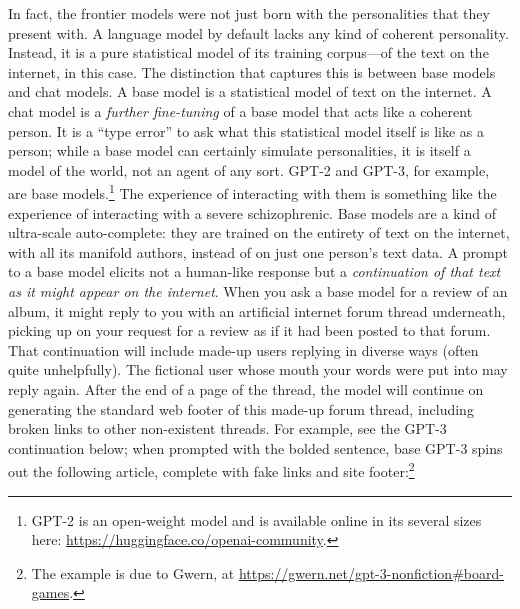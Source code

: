 In fact, the frontier models were not just born with the personalities that
they present with. A language model by default lacks any kind of coherent
personality. Instead, it is a pure statistical model of its training
corpus---of the text on the internet, in this case. The distinction that
captures this is between base models and chat models. A base model is a
statistical model of text on the internet. A chat model is a \emph{further
fine-tuning} of a base model that acts like a coherent person. It is a ``type
error'' to ask what this statistical model itself is like as a person; while a
base model can certainly simulate personalities, it is itself a model of the
world, not an agent of any sort. GPT-2 and GPT-3, for example, are base
models.\footnote{GPT-2 is an open-weight model and is available online in its
several sizes here: \url{https://huggingface.co/openai-community}.} The
experience of interacting with them is something like the experience of
interacting with a severe schizophrenic. Base models are a kind of ultra-scale
auto-complete: they are trained on the entirety of text on the internet, with
all its manifold authors, instead of on just one person's text data. A prompt
to a base model elicits not a human-like response but a \emph{continuation of
that text as it might appear on the internet}. When you ask a base model for a
review of an album, it might reply to you with an artificial internet forum
thread underneath, picking up on your request for a review as if it had been
posted to that forum. That continuation will include made-up users replying in
diverse ways (often quite unhelpfully). The fictional user whose mouth your
words were put into may reply again. After the end of a page of the thread, the
model will continue on generating the standard web footer of this made-up forum
thread, including broken links to other non-existent threads. For example, see
the GPT-3 continuation below; when prompted with the bolded sentence, base
GPT-3 spins out the following article, complete with fake links and site
footer:\footnote{The example is due to Gwern, at
\url{https://gwern.net/gpt-3-nonfiction\#board-games}.}



